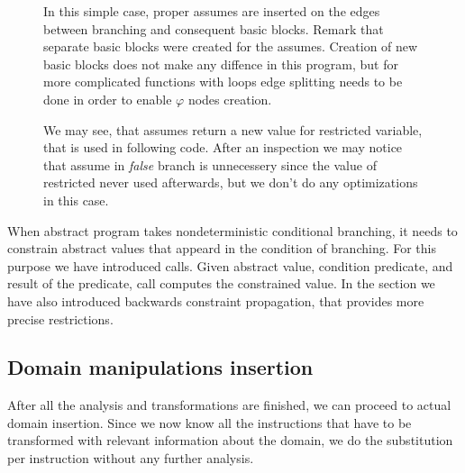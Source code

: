 \begin{figure}
\begin{example}
{
}
\bigskip

In this simple case, proper assumes are inserted on the edges between branching
and consequent basic blocks. Remark that separate basic blocks were created for
the assumes. Creation of new basic blocks does not make any diffence in this
program, but for more complicated functions with loops edge splitting needs
to be done in order to enable $\varphi$ nodes creation.

We may see, that assumes return a new value for restricted variable, that is
used in following code. After an inspection we may notice that assume in
\emph{false} branch is unnecessery since the value of restricted
 never used afterwards, but we don't do any optimizations
in this case.
\end{example}
\end{figure}

\begin{summary}
When abstract program takes nondeterministic conditional branching, it needs to
constrain abstract values that appeard in the condition of branching. For this
purpose we have introduced  calls. Given abstract value, condition
predicate, and result of the predicate,  call computes the
constrained value. In the section we have also introduced backwards constraint
propagation, that provides more precise restrictions.
\end{summary}

\subsection{Domain manipulations insertion}

After all the analysis and transformations are finished, we can proceed to actual
domain insertion. Since we now know all the instructions that have to be
transformed with relevant information about the domain, we do the substitution
per instruction without any further analysis.

